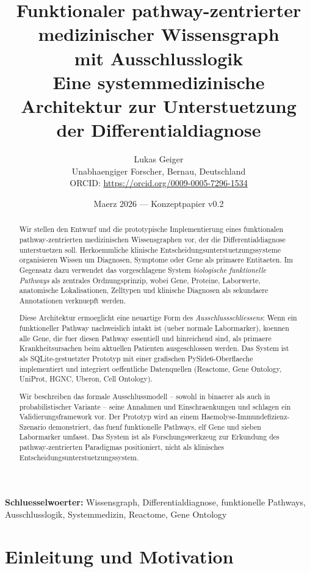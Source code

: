 \documentclass[12pt,a4paper]{article}
\title{%
    \textbf{Funktionaler pathway-zentrierter medizinischer Wissensgraph\\
    mit Ausschlusslogik}\\[0.5em]
    \large Eine systemmedizinische Architektur zur Unterstuetzung der Differentialdiagnose
}
\author{
    Lukas Geiger\\
    Unabhaengiger Forscher, Bernau, Deutschland\\
    ORCID: \url{https://orcid.org/0009-0005-7296-1534}
}
\date{Maerz 2026 --- Konzeptpapier v0.2}
\begin{document}
\maketitle

\begin{abstract}
Wir stellen den Entwurf und die prototypische Implementierung eines funktionalen pathway-zentrierten medizinischen Wissensgraphen vor, der die Differentialdiagnose unterstuetzen soll. Herkoemmliche klinische Entscheidungsunterstuetzungssysteme organisieren Wissen um Diagnosen, Symptome oder Gene als primaere Entitaeten. Im Gegensatz dazu verwendet das vorgeschlagene System \emph{biologische funktionelle Pathways} als zentrales Ordnungsprinzip, wobei Gene, Proteine, Laborwerte, anatomische Lokalisationen, Zelltypen und klinische Diagnosen als sekundaere Annotationen verknuepft werden.

Diese Architektur ermoeglicht eine neuartige Form des \emph{Ausschlussschliessens}: Wenn ein funktioneller Pathway nachweislich intakt ist (ueber normale Labormarker), koennen alle Gene, die fuer diesen Pathway essentiell und hinreichend sind, als primaere Krankheitsursachen beim aktuellen Patienten ausgeschlossen werden. Das System ist als SQLite-gestuetzter Prototyp mit einer grafischen PySide6-Oberflaeche implementiert und integriert oeffentliche Datenquellen (Reactome, Gene Ontology, UniProt, HGNC, Uberon, Cell Ontology).

Wir beschreiben das formale Ausschlussmodell -- sowohl in binaerer als auch in probabilistischer Variante -- seine Annahmen und Einschraenkungen und schlagen ein Validierungsframework vor. Der Prototyp wird an einem Haemolyse-Immundefizienz-Szenario demonstriert, das fuenf funktionelle Pathways, elf Gene und sieben Labormarker umfasst. Das System ist als Forschungswerkzeug zur Erkundung des pathway-zentrierten Paradigmas positioniert, nicht als klinisches Entscheidungsunterstuetzungssystem.
\end{abstract}

\smallskip
\noindent\textbf{Schluesselwoerter:} Wissensgraph, Differentialdiagnose, funktionelle Pathways, Ausschlusslogik, Systemmedizin, Reactome, Gene Ontology

\section{Einleitung und Motivation}
\label{sec:introduction}
\end{document}
